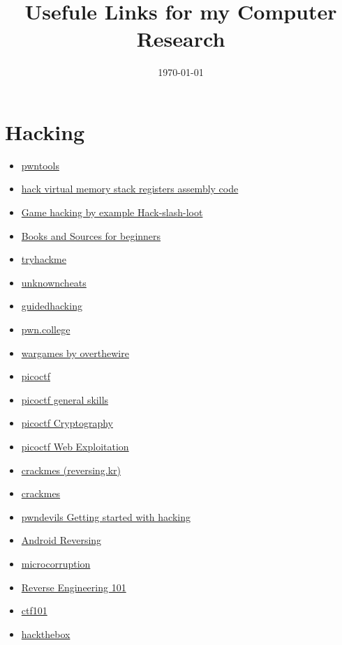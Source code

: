 \documentclass[a4paper, 12pt]{scrartcl}
\title{Usefule Links for my Computer Research}
\date{\today}
\begin{document}
    \maketitle
    \tableofcontents
    \section {Hacking}
    \begin{itemize}
        \item \href{https://github.com/Gallopsled/pwntools}{pwntools} 
        \item \href{https://blog.holbertonschool.com/hack-virtual-memory-stack-registers-assembly-code/}{hack virtual memory stack registers assembly code}
        \item \href{https://0x00sec.org/t/game-hacking-hack-slash-loot/3711}{Game hacking by example Hack-slash-loot}
        \item \href{https://0x00sec.org/t/books-and-sources-for-beginners/1452/3}{Books and Sources for beginners}
        \item \href{https://tryhackme.com/hacktivities}{tryhackme}
        \item \href{https://unknowncheats.me/}{unknowncheats}
        \item \href{guidedhacking.com}{guidedhacking}
        \item \href{https://pwn.college/}{pwn.college}
        \item \href{https://overthewire.org/wargames/}{wargames by overthewire}
        \item \href{https://picoctf.org/}{picoctf}
        \item \href{https://picoctf.org/learning_guides/Book-1-General-Skills.pdf}{picoctf general skills}
        \item \href{https://picoctf.org/learning_guides/Book-2-Cryptography.pdf}{picoctf Cryptography}
        \item \href{https://picoctf.org/learning_guides/Book-3-Web-Exploitation.pdf}{picoctf Web Exploitation}
        \item \href{http://reversing.kr/}{crackmes (reversing.kr)}
        \item \href{https://crackmes.one/}{crackmes}
        \item \href{https://pwndevils.com/getting-started}{pwndevils Getting started with hacking}
        \item \href{file:///D:/Documents/ProgrammierenResources/O&D%20-%20Android%20Reverse%20Engineering.pdf}{Android Reversing}
        \item \href{https://microcorruption.com/}{microcorruption}
        \item \href{https://vimeo.com/6764570}{Reverse Engineering 101}
        \item \href{https://ctf101.org/}{ctf101}
        \item \href{https://www.hackthebox.eu/individuals}{hackthebox}
    \end{itemize}
\end{document}

